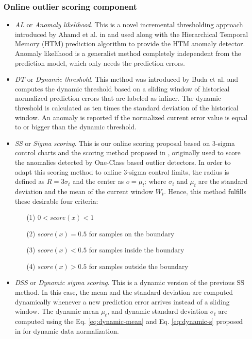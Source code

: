 \documentclass[a4paper]{article}\usepackage[]{graphicx}\usepackage[]{color}
\begin{document}
\subsubsection{Online outlier scoring component}

\begin{itemize}

\item \emph{AL} or \emph{Anomaly likelihood}. This is a novel incremental thresholding approach introduced by Ahamd et al. in \cite{Ahmad2017} and used along with the Hierarchical Temporal Memory (HTM) prediction algorithm to provide the HTM anomaly detector. Anomaly likelihood is a generalist method completely independent from the prediction model, which only needs the prediction errors.
\item \emph{DT} or \emph{Dynamic threshold}. This method was introduced by Buda et al. \cite{Buda2018} and computes the dynamic threshold based on a sliding window of historical normalized prediction errors that are labeled as inliner. The dynamic threshold is calculated as ten times the standard deviation of the historical window. An anomaly is reported if the normalized current error value is equal to or bigger than the dynamic threshold.
\item \emph{SS} or \emph{Sigma scoring}. This is our online scoring proposal based on 3-sigma control charts and the scoring method proposed in \cite{Wang2019},  originally used to score the anomalies detected by One-Class based outlier detectors. In order to adapt this scoring method to online 3-sigma control limits, the radius is defined as $R = 3\sigma_{t}$ and the center as $o = \mu_{t}$; where $\sigma_{t}$ and $\mu_{t}$ are the standard deviation and the mean of the current window $W_{t}$. Hence, this method fulfills these desirable four criteria:

    \begin{itemize}
        \item [(1)] $0 < score(x) < 1$
        \item [(2)] $score(x) = 0.5$ for samples on the boundary
        \item [(3)] $score(x) < 0.5$ for samples inside the boundary
        \item [(4)] $score(x) > 0.5$ for samples outside the boundary
    \end{itemize}

\item \emph{DSS} or \emph{Dynamic sigma scoring}. This is a dynamic version of the previous SS method. In this case, the mean and the standard deviation are computed dynamically whenever a new prediction error arrives instead of a sliding window. The dynamic mean $\mu_{t}$, and dynamic standard deviation $\sigma_{t}$ are computed using the Eq. \eqref{eq:dynamic-mean} and Eq. \eqref{eq:dynamic-s} proposed in \cite{Bollegala2017} for dynamic data normalization.

\end{itemize}
\end{document}
